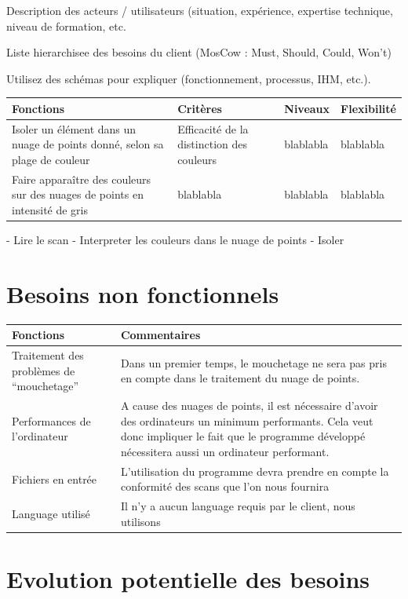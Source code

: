 \documentclass[12pt,titlepage]{report}
\begin{document}
Description des acteurs / utilisateurs (situation, expérience, expertise technique, niveau de formation, etc.

Liste hierarchisee des besoins du client (MosCow : Must, Should, Could, Won't)

Utilisez des schémas pour expliquer (fonctionnement, processus, IHM, etc.).

\begin{tabular}{|p{6cm}|p{4cm}|p{3cm}|p{3cm}|}
  \hline
  Fonctions 
  & Critères 
  & Niveaux
  & Flexibilité \\
  \hline
  Isoler un élément dans un nuage de points donné, selon sa plage de couleur 
  & Efficacité de la distinction des couleurs
  & blablabla
  & blablabla\\
  \hline
  Faire apparaître des couleurs sur des nuages de points en intensité de gris
  & blablabla
  & blablabla
  & blablabla\\
  \hline
\end{tabular}

- Lire le scan
- Interpreter les couleurs dans le nuage de points
- Isoler 

\section{Besoins non fonctionnels}


\begin{tabular}{|p{6cm}|p{11cm}|}
    \hline
    Fonctions
    & Commentaires \\
    \hline
    Traitement des problèmes de “mouchetage” 
    & Dans un premier temps, le mouchetage ne sera pas pris en compte dans le traitement du nuage de points.\\
    \hline
    Performances de l'ordinateur
    & A cause des nuages de points, il est nécessaire d'avoir des ordinateurs un minimum performants. Cela veut donc impliquer le fait que le programme développé nécessitera aussi un ordinateur performant. \\
    \hline
    Fichiers en entrée
    & L'utilisation du programme devra prendre en compte la conformité des scans que l'on nous fournira \\
    \hline
    Language utilisé
    & Il n'y a aucun language requis par le client, nous utilisons \\
    \hline
\end{tabular}


\section{Evolution potentielle des besoins}
\end{document}
